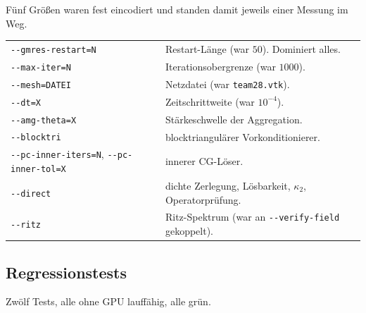 \documentclass[11pt,a4paper]{article}
\newcommand{\code}[1]{\texttt{\small #1}}
\newcommand{\kappazwei}{\kappa_2}
\begin{document}
Fünf Größen waren fest eincodiert und standen damit jeweils einer Messung im
Weg.

\begin{center}
\small
\begin{tabular}{ll}
\toprule
\code{-{}-gmres-restart=N} & Restart-Länge (war $50$). Dominiert alles. \\
\code{-{}-max-iter=N}      & Iterationsobergrenze (war $1000$). \\
\code{-{}-mesh=DATEI}      & Netzdatei (war \code{team28.vtk}). \\
\code{-{}-dt=X}            & Zeitschrittweite (war $10^{-4}$). \\
\code{-{}-amg-theta=X}     & Stärkeschwelle der Aggregation. \\
\code{-{}-blocktri}        & blocktriangulärer Vorkonditionierer. \\
\code{-{}-pc-inner-iters=N}, \code{-{}-pc-inner-tol=X} & innerer CG-Löser. \\
\code{-{}-direct}          & dichte Zerlegung, Lösbarkeit, $\kappazwei$,
                             Operatorprüfung. \\
\code{-{}-ritz}            & Ritz-Spektrum (war an \code{-{}-verify-field}
                             gekoppelt). \\
\bottomrule
\end{tabular}
\end{center}

\subsection{Regressionstests}

Zwölf Tests, alle ohne GPU lauffähig, alle grün.
\end{document}
